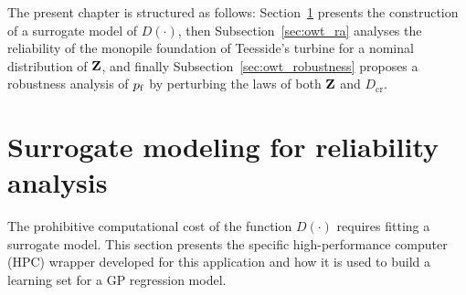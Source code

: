 The present chapter is structured as follows: 
Section~\ref{sec:owt_surrogate} presents the construction of a surrogate model of $D(\cdot)$,
then Subsection~\ref{sec:owt_ra} analyses the reliability of the monopile foundation of Teesside's turbine for a nominal distribution of ${\bf Z}$, 
and finally Subsection~\ref{sec:owt_robustness} proposes a robustness analysis of $p_\mathrm{f}$ by perturbing the laws of both ${\bf Z}$ and $D_{\mathrm{cr}}$.

\section{Surrogate modeling for reliability analysis}\label{sec:owt_surrogate}
The prohibitive computational cost of the function $D(\cdot)$ requires fitting a surrogate model.  
This section presents the specific high-performance computer (HPC) wrapper developed for this application and how it is used to build a learning set for a GP regression model. 

